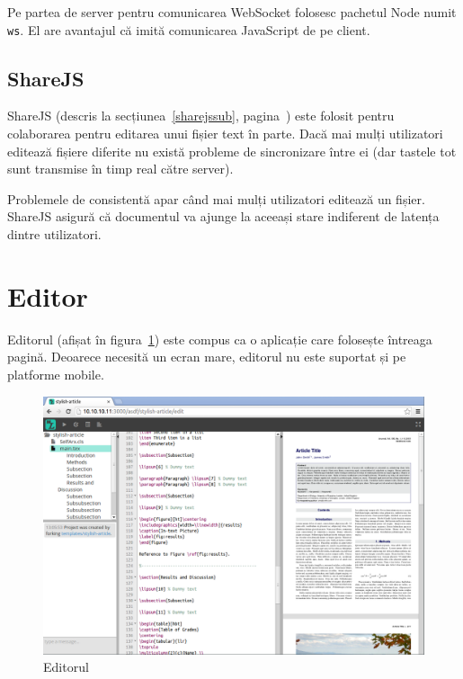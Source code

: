 \documentclass[a4wide,12pt]{report}
\newcommand{\cod}[1]{\texttt{#1}}
\begin{document}
Pe partea de server pentru comunicarea WebSocket folosesc pachetul Node numit
\cod{ws}. El are avantajul că imită comunicarea JavaScript de pe client.

\subsection{ShareJS}

ShareJS (descris la secțiunea~\ref{sharejssub}, pagina~\pageref{sharejssub})
este folosit pentru colaborarea pentru editarea unui fișier text în parte.
Dacă mai mulți utilizatori editează fișiere diferite nu există probleme de
sincronizare între ei (dar tastele tot sunt transmise în timp real către
server).

Problemele de consistentă apar când mai mulți utilizatori editează un fișier.
ShareJS asigură că documentul va ajunge la aceeași stare indiferent de
latența dintre utilizatori.

\section{Editor}

Editorul (afișat în figura~\ref{editorfig}) este compus ca o aplicație care
folosește întreaga pagină. Deoarece necesită un ecran mare, editorul nu este
suportat și pe platforme mobile.

\begin{figure}[bh]
\begin{center}
\includegraphics[width=16cm]{imagini/editor}
\end{center}
\caption{Editorul}
\label{editorfig}
\end{figure}
\end{document}
